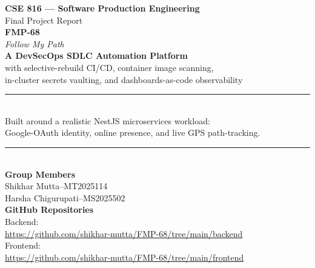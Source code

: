 \documentclass[11pt,a4paper]{article}
\begin{document}
\begin{titlepage}
\thispagestyle{empty}
\begin{center}
\vspace*{0.5cm}

{\Large \textbf{CSE 816 — Software Production Engineering}}\\[0.3cm]
{\large Final Project Report}\\[1.5cm]

{\Huge \textbf{FMP-68}}\\[0.2cm]
{\large \emph{Follow My Path}}\\[0.3cm]
{\LARGE \textbf{A DevSecOps SDLC Automation Platform}}\\[0.2cm]
{\large with selective-rebuild CI/CD, container image scanning,\\
in-cluster secrets vaulting, and dashboards-as-code observability}\\[1cm]

\rule{0.7\textwidth}{0.4pt}\\[0.3cm]
{\large Built around a realistic NestJS microservices workload:\\
Google-OAuth identity, online presence, and live GPS path-tracking.}\\
\rule{0.7\textwidth}{0.4pt}\\[1cm]

\textbf{\Large Group Members}\\[0.3cm]
{\large Shikhar Mutta\quad--\quad MT2025114}\\[0.2cm]
{\large Harsha Chigurupati\quad--\quad MS2025502}\\[1cm]

\textbf{\Large GitHub Repositories}\\[0.3cm]
{\large Backend:}\\
\url{https://github.com/shikhar-mutta/FMP-68/tree/main/backend}\\[0.4cm]
{\large Frontend:}\\
\url{https://github.com/shikhar-mutta/FMP-68/tree/main/frontend}
\end{center}
\end{titlepage}

\tableofcontents
\thispagestyle{empty}
\newpage
\end{document}
